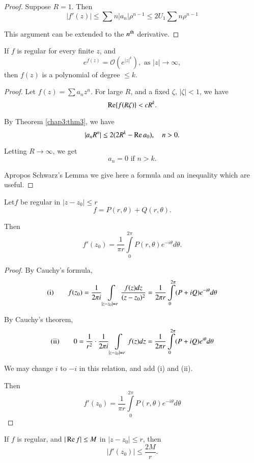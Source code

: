 \begin{proof}
Suppose $R = 1$. Then
$$
|f'(z)| \leq \sum n |a_n| \rho^{n-1} \leq 2 U_1 \sum n \rho^{n-1} 
$$

This argument can be extended to the $n^{\rm th}$ derivative.
\end{proof}

\begin{corollary}\label{chap3:coro2}
If $f$ is regular for every finite $z$, and 
$$
e^{f(z)} = \mathcal{O} (e^{|z|^k}), \text{ as } |z| \to \infty,
$$
then $f(z)$ is a polynomial of degree $\leq k$.
\end{corollary}

\begin{proof}
Let $f(z) =\sum a_n z^n$. For large $R$, and a fixed $\zeta$,
$|\zeta|<1$, we have
$$
\operatorname{Re} \{f(R \zeta )\} < c R^k.
$$

By Theorem \ref{chap3:thm3}, we have
$$
|a_n R^n| \leq 2 (2 R^k - \operatorname{Re} a_0), \quad n >0.
$$

Letting $R \to \infty$, we get
$$
a_n = 0 \text{ if } n > k.
$$

Apropos Schwarz's Lemma we give here a formula and an inequality which
are useful.
\end{proof}

\begin{thm}\label{chap3:thm4}
Let\pageoriginale $f$ be regular in $|z-z_0| \leq r$
$$
f = P(r,\theta) + Q (r,\theta).
$$

Then
$$
f'(z_0) = \frac{1}{\pi r} \int\limits^{2\pi}_0 P(r,\theta) e^{ - i\theta}
d \theta.
$$
\end{thm}

\begin{proof}
By Cauchy's formula,
 $$
{\rm (i)} \qquad  f(z_0) = \frac{1}{2\pi i } \int\limits_{|z-z_0|=r}
\frac{f(z)dz}{(z-z_0)^2} =\frac{1}{2\pi r} \int\limits^{2\pi}_0 (P+iQ)
e^{-i\theta}d \theta 
$$
 
By Cauchy's theorem,
$$
{\rm (ii)} \qquad 0 = \frac{1}{r^2} \cdot \frac{1}{2\pi i}
\int\limits_{|z-z_0|=r} f(z) dz = \frac{1}{2\pi r}
\int\limits^{2\pi}_{0} (P + iQ) e^{i\theta} d\theta
$$

We may change $i$ to $-i$ in this relation, and add (i) and (ii).

Then
$$
f'(z_0) = \frac{1}{\pi r} \int\limits^{2\pi}_0 P(r, \theta)
e^{-i\theta} d\theta
$$
\end{proof}

\begin{coro*}
If $f$ is regular, and $|\operatorname{Re} f| \leq M$ in $|z-z_0| \leq r$, then
$$
|f'(z_0)| \leq \frac{2M}{r}.
$$
\end{coro*}

